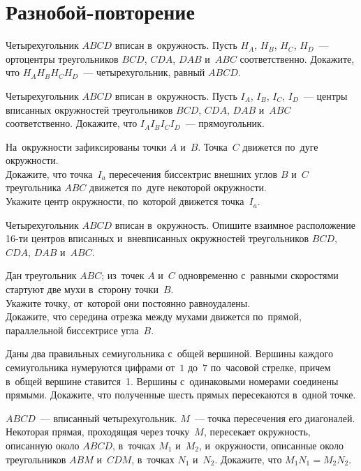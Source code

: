 
\section*{Разнобой-повторение}


\begin{problems}

\item
Четырехугольник $ABCD$ вписан в~окружность.
Пусть $H_A$, $H_B$, $H_C$, $H_D$~--- ортоцентры треугольников
$BCD$, $CDA$, $DAB$ и~$ABC$ соответственно.
Докажите, что $H_A H_B H_C H_D$~--- четырехугольник, равный $ABCD$.

\item
Четырехугольник $ABCD$ вписан в~окружность.
Пусть $I_A$, $I_B$, $I_C$, $I_D$~--- центры вписанных окружностей треугольников
$BCD$, $CDA$, $DAB$ и~$ABC$ соответственно.
Докажите, что $I_A I_B I_C I_D$~--- прямоугольник.

\item
На~окружности зафиксированы точки $A$ и~$B$.
Точка~$C$ движется по~дуге окружности.
\\
\subproblem
Докажите, что точка~$I_a$ пересечения биссектрис внешних углов $B$ и~$C$
треугольника $ABC$ движется по~дуге некоторой окружности.
\\
\subproblem
Укажите центр окружности, по~которой движется точка~$I_a$.

\item
Четырехугольник $ABCD$ вписан в~окружность.
Опишите взаимное расположение 16-ти центров вписанных и~вневписанных
окружностей треугольников $BCD$, $CDA$, $DAB$ и~$ABC$.

\item
Дан треугольник $ABC$;
из~точек $A$ и~$C$ одновременно с~равными скоростями стартуют две мухи
в~сторону точки~$B$.
\\
\subproblem
Укажите точку, от~которой они постоянно равноудалены.
\\
\subproblem
Докажите, что середина отрезка между мухами движется по~прямой, параллельной
биссектрисе угла~$B$.

\item
Даны два правильных семиугольника с~общей вершиной.
Вершины каждого семиугольника нумеруются цифрами от~$1$ до~$7$ по~часовой
стрелке, причем в~общей вершине ставится~1.
Вершины с~одинаковыми номерами соединены прямыми.
Докажите, что полученные шесть прямых пересекаются в~одной точке.

\item
$ABCD$~--- вписанный четырехугольник.
$M$~--- точка пересечения его диагоналей.
Некоторая прямая, проходящая через точку~$M$, пересекает
окружность, описанную около $ABCD$, в~точках $M_1$ и~$M_2$, и~окружности,
описанные около треугольников $ABM$ и~$CDM$, в~точках $N_1$ и~$N_2$.
Докажите, что $M_1 N_1 = M_2 N_2$.

\end{problems}


